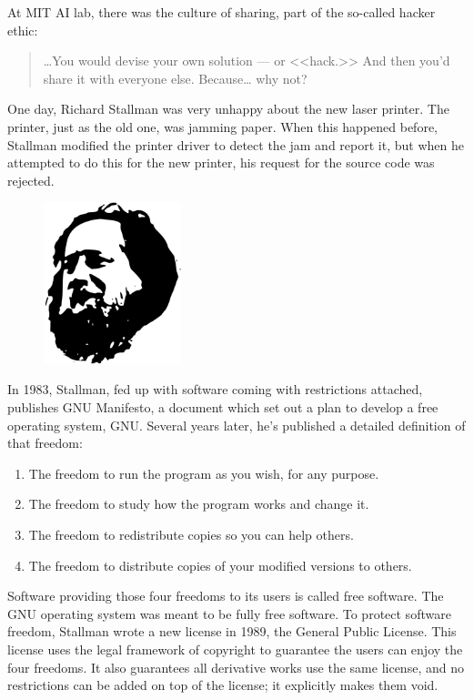 \documentclass[10pt, a5paper]{article}
\begin{document}
At MIT AI lab, there was the culture of sharing, part of the so-called hacker ethic:

\begin{quotation}
\ldots{}You would devise your own solution --- or <<hack.>> And then you'd share it with everyone else. Because\ldots{} why not?

\end{quotation}

One day, Richard Stallman was very unhappy about the new laser printer. The printer, just as the old one, was jamming paper. When this happened before, Stallman modified the printer driver to detect the jam and report it, but when he attempted to do this for the new printer, his request for the source code was rejected.

\begin{center}
\begin{figure}[h!]
  \centering
  \includegraphics[width=4cm]{14_2019_Shadura4.png}
  
  \label{fig4}
\end{figure}
\end{center}

In 1983, Stallman, fed up with software coming with restrictions attached, publishes GNU Manifesto, a document which set out a plan to develop a free operating system, GNU. Several years later, he's published a detailed definition of that freedom:

\begin{enumerate}
  \item The freedom to run the program as you wish, for any purpose.
  \item The freedom to study how the program works and change it.
  \item The freedom to redistribute copies so you can help others.
  \item The freedom to distribute copies of your modified versions to others.
\end{enumerate}

Software providing those four freedoms to its users is called free software. The GNU operating system was meant to be fully free software. To protect software freedom, Stallman wrote a new license in 1989, the General Public License. This license uses the legal framework of copyright to guarantee the users can enjoy the four freedoms. It also guarantees all derivative works use the same license, and no restrictions can be added on top of the license; it explicitly makes them void.
\end{document}
